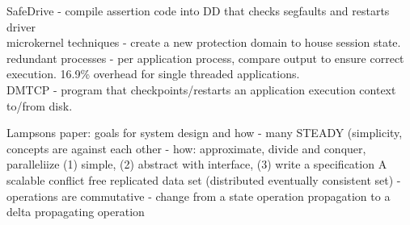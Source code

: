\documentclass{article}
\begin{document}
\noindent\cite{zhou:osdi2006-safedrive} SafeDrive - compile assertion code into DD that checks segfaults and restarts driver\\

\noindent\cite{david:osdi2008-curios} microkernel techniques - create a new protection domain to house session state.\\

\noindent\cite{shye:DSN2007-plr} redundant processes - per application process, compare output to ensure correct execution. 16.9\% overhead for single threaded applications.\\

\noindent\cite{ansel:ipdps2009-dmtcp} DMTCP - program that checkpoints/restarts an application execution context to/from disk. 

Lampsons paper: goals for system design and how
	- many STEADY (simplicity, concepts are against each other
	- how: approximate, divide and conquer, paralleliize
	(1) simple, (2) abstract with interface, (3) write a specification
A scalable conflict free replicated data set (distributed eventually consistent set)
	- operations are commutative
	- change from a state operation propagation to a delta propagating operation





\newpage
\onecolumn
\appendix
\end{document}
